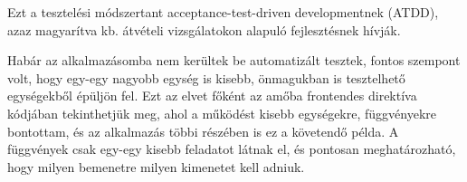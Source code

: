 Ezt a tesztelési módszertant acceptance-test-driven developmentnek (ATDD), azaz magyarítva kb. átvételi vizsgálatokon alapuló fejlesztésnek hívják. \cite{atdd}


Habár az alkalmazásomba nem kerültek be automatizált tesztek, fontos szempont volt, hogy egy-egy nagyobb egység is kisebb, önmagukban is tesztelhető egységekből épüljön fel. Ezt az elvet főként az amőba frontendes direktíva kódjában tekinthetjük meg, ahol a működést kisebb egységekre, függvényekre bontottam, és az alkalmazás többi részében is ez a követendő példa. A függvények csak egy-egy kisebb feladatot látnak el, és pontosan meghatározható, hogy milyen bemenetre milyen kimenetet kell adniuk.





























